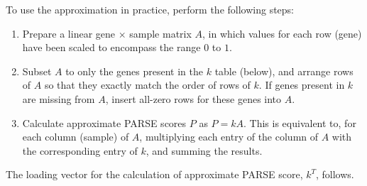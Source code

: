 To use the approximation in practice, perform the following steps:
\begin{enumerate}
  \item Prepare a linear gene $\times$ sample matrix $A$, in which values for each row (gene) have been scaled to encompass the range $0$ to $1$.
  \item Subset $A$ to only the genes present in the $k$ table (below), and arrange rows of $A$ so that they exactly match the order of rows of $k$.  If genes present in $k$ are missing from $A$, insert all-zero rows for these genes into $A$.
  \item Calculate approximate \gls{PARSE} scores $P$ as $P = k A$.  This is equivalent to, for each column (sample) of $A$, multiplying each entry of the column of $A$ with the corresponding entry of $k$, and summing the results.
\end{enumerate}

The loading vector for the calculation of approximate \gls{PARSE} score, $k^T$, follows.

